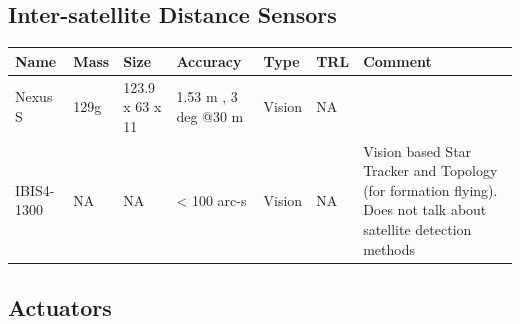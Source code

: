 \subsection{Inter-satellite Distance Sensors}


\begin{center}
     \begin{tabular}{ |p{2cm} | l | l | l | l | l | p{5cm} |}
     \hline

      {\bf Name} & {\bf Mass} & {\bf Size} & {\bf Accuracy} & {\bf Type} & {\bf TRL} & {\bf Comment}  \\ \hline

     Nexus S \cite{Ref:ids2} & 129g & 123.9 x 63 x 11 & 1.53 m , 3 deg @30 m & Vision & NA  &   \\ \hline

     IBIS4-1300 \cite{Ref:ids1} & NA & NA & < 100 arc-s & Vision & NA & Vision based Star Tracker and Topology (for formation flying). Does not talk about satellite detection methods \\ \hline
     \end{tabular}
\end{center}


\subsection{Actuators}


